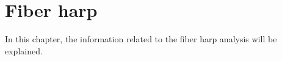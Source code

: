 \chapter{Fiber harp}
\label{chap:fiberharp}

In this chapter, the information related to the fiber harp analysis will be explained.
